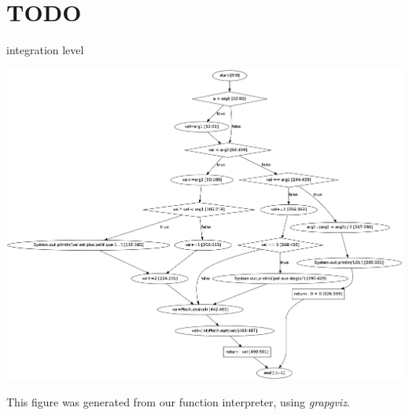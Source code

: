 \documentclass[a4paper]{report}
\begin{document}
\section*{{\color{red} \textbf{TODO}}}
integration level

   \centerline{
   \includegraphics[scale=0.3]{../graphviz/realExemple.png}
}
This figure was generated from our function interpreter, using \textit{grapgviz}.
\newpage
\end{document}

